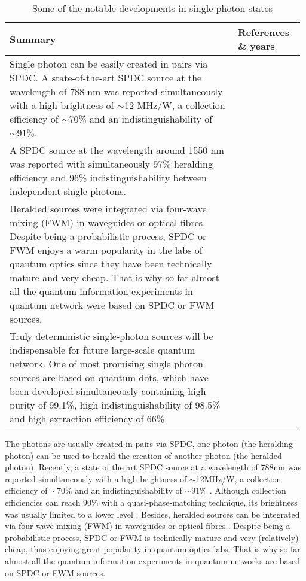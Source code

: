 \begin{table*}[!htbp]
	\begin{tabular}{|p{0.755\linewidth}|p{0.22\linewidth}|}
		\hline
		Summary & References \& years \\
		\hline \hline
		Single photon can be easily created in pairs via SPDC. A state-of-the-art SPDC source at the wavelength of 788 nm was reported simultaneously with a high brightness of $\sim$12 MHz/W, a collection efficiency of $\sim$70\% and an indistinguishability of $\sim 91\%$. & \cite{bib:wang2016experimental} \\
		\hline
		A SPDC source at the wavelength around 1550 nm was reported with simultaneously 97\% heralding efficiency and 96\% indistinguishability between independent single photons. & \cite{bib:zhong201812} \\
		\hline
		Heralded sources were integrated via four-wave mixing (FWM) in waveguides or optical fibres. Despite being a probabilistic process, SPDC or FWM enjoys a warm popularity in the labs of quantum optics since they have been technically mature and very cheap. That is why so far almost all the quantum information experiments in quantum network were based on SPDC or FWM sources. & \cite{bib:silverstone2014, bib:spring2017chip, bib:goldschmidt2008, bib:smith2009} \\
		\hline
		Truly deterministic single-photon sources will be indispensable for future large-scale quantum network. One of most promising single photon sources are based on quantum dots, which have been developed simultaneously containing high purity of 99.1\%, high indistinguishability of 98.5\% and high extraction efficiency of 66\%. & \cite{bib:he2013on, bib:wei2014de, bib:ding2016on, bib:somaschi2016, bib:wang2016near, bib:loredo2016} \\
		\hline
	\end{tabular}
	\captionspacetab \caption{Some of the notable developments in single-photon states} \label{tab:single_photon_state}
\end{table*}

The photons are usually created in pairs via SPDC, one photon (the heralding photon) can be used to herald the creation of another photon (the heralded photon). Recently, a state of the art SPDC source at a wavelength of 788nm was reported simultaneously with a high brightness of $\sim$12MHz/W, a collection efficiency of $\sim 70\%$ and an indistinguishability of $\sim 91\%$ \cite{bib:tenPhotEnt}. Although collection efficiencies can reach 90\% with a quasi-phase-matching technique, its brightness was usually limited to a lower level \cite{bib:giustina2013, bib:christensen2013}. Besides, heralded sources can be integrated via four-wave mixing (FWM) in waveguides  \cite{bib:silverstone2014, bib:spring2016} or optical fibres \cite{bib:goldschmidt2008, bib:smith2009}. Despite being a probabilistic process, SPDC or FWM is technically mature and very (relatively) cheap, thus enjoying great popularity in quantum optics labs. That is why so far almost all the quantum information experiments in quantum networks are based on SPDC or FWM sources.


